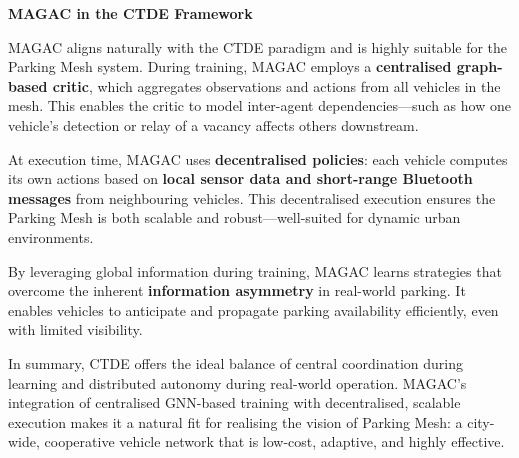 \vspace{0.5em}
\noindent\textbf{MAGAC in the CTDE Framework}

MAGAC aligns naturally with the CTDE paradigm and is highly suitable for the Parking Mesh system. During training, MAGAC employs a \textbf{centralised graph-based critic}, which aggregates observations and actions from all vehicles in the mesh. This enables the critic to model inter-agent dependencies—such as how one vehicle’s detection or relay of a vacancy affects others downstream.

At execution time, MAGAC uses \textbf{decentralised policies}: each vehicle computes its own actions based on \textbf{local sensor data and short-range Bluetooth messages} from neighbouring vehicles. This decentralised execution ensures the Parking Mesh is both scalable and robust—well-suited for dynamic urban environments.

By leveraging global information during training, MAGAC learns strategies that overcome the inherent \textbf{information asymmetry} in real-world parking. It enables vehicles to anticipate and propagate parking availability efficiently, even with limited visibility.

In summary, CTDE offers the ideal balance of central coordination during learning and distributed autonomy during real-world operation. MAGAC’s integration of centralised GNN-based training with decentralised, scalable execution makes it a natural fit for realising the vision of Parking Mesh: a city-wide, cooperative vehicle network that is low-cost, adaptive, and highly effective.
